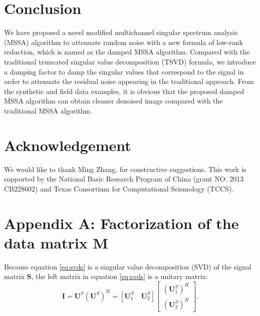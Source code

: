 

\section{Conclusion}
We have proposed a novel modified multichannel singular spectrum analysis (MSSA) algorithm to attenuate random noise with a new formula of low-rank reduction, which is named as the damped MSSA algorithm. Compared with the traditional truncated singular value decomposition (TSVD) formula, we introduce a damping factor to damp the singular values that correspond to the signal in order to attenuate the residual noise appearing in the traditional approach. %
  From the synthetic and field data examples, it is obvious that the proposed damped MSSA algorithm can obtain cleaner denoised image  compared with the traditional MSSA algorithm.

\section{Acknowledgement}
We would like to thank Ming Zhang,  for constructive suggestions. This work is supported by the National Basic Research Program of China (grant NO: 2013 CB228602) and Texas Consortium for Computational Seismology (TCCS). 

\section{Appendix A: Factorization of the data matrix $\mathbf{M}$}
Because equation \ref{eq:svds} is a singular value decomposition (SVD) of the signal matrix $\mathbf{S}$, the left matrix in equation \ref{eq:svds} is a unitary matrix:
\begin{equation}
\label{eq:unit}
\mathbf{I}=\mathbf{U}^S(\mathbf{U}^S)^H=[\mathbf{U}_1^S\quad \mathbf{U}_2^S]\left[\begin{array}{c} 
(\mathbf{U}_1^S)^H \\
(\mathbf{U}_2^S)^H 
\end{array}
\right].
\end{equation}

